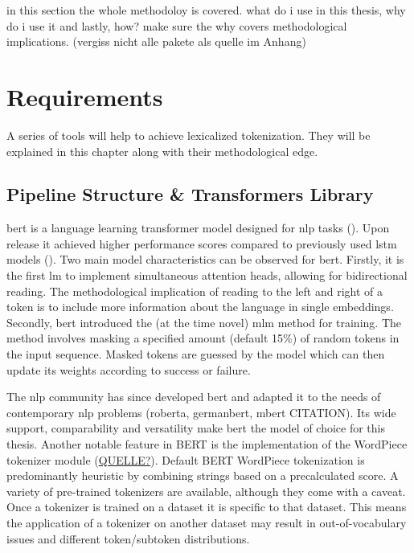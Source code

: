 in this section the whole methodoloy is covered.
what do i use in this thesis, why do i use it and lastly, how?
make sure the why covers methodological implications.
(vergiss nicht alle pakete als quelle im Anhang)

\section{Requirements}
\label{sec:requirements}
A series of tools will help to achieve lexicalized tokenization.
They will be explained in this chapter along with their methodological edge.

\subsection{Pipeline Structure \& Transformers Library}
\label{subsec:architecture}

\ac{bert} is a language learning transformer model designed for \ac{nlp} tasks (\cite{ATTENTION}).
Upon release it achieved higher performance scores compared to previously used \ac{lstm} models (\cite{BERTHIGH1}).
Two main model characteristics can be observed for \ac{bert}.
Firstly, it is the first \ac{lm} to implement simultaneous attention heads, allowing for bidirectional reading.
The methodological implication of reading to the left and right of a token is to include more information about the language in single embeddings.
Secondly, \ac{bert} introduced the (at the time novel) \ac{mlm} method for training.
The method involves masking a specified amount (default 15\%) of random tokens in the input sequence.
Masked tokens are guessed by the model which can then update its weights according to success or failure.

The \ac{nlp} community has since developed \ac{bert} and adapted it to the needs of contemporary \ac{nlp} problems (roberta, germanbert, mbert \uppercase{citation}).
Its wide support, comparability and versatility make \ac{bert} the model of choice for this thesis.
Another notable feature in \uppercase{bert} is the implementation of the WordPiece tokenizer module (\uppercase{\href{https://huggingface.co/course/chapter6/6?fw=pt}{quelle?}}).
Default BERT WordPiece tokenization is predominantly heuristic by combining strings based on a precalculated score.
A variety of pre-trained tokenizers are available, although they come with a caveat.
Once a tokenizer is trained on a dataset it is specific to that dataset.
This means the application of a tokenizer on another dataset may result in out-of-vocabulary issues and different token/subtoken distributions.

